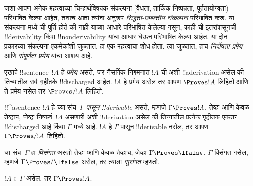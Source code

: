 \documentclass[../../../include/open-logic-section]{subfiles}
\begin{document}
      {}
      {}







\begin{explain}
जशा आपण अनेक महत्त्वाच्या चिन्हार्थविषयक संकल्पना (वैधता, तार्किक निष्पन्नता,
पूर्ततायोग्यता) परिभाषित केल्या आहेत, तशाच आता त्यांना अनुरूप
\emph{सिद्धता-उपपत्तीय संकल्पना} परिभाषित करू. या संकल्पना मध्ये
ची पूर्ति होते की नाही याच्या आधारे परिभाषित केलेल्या नसून,
काही ची इतरांपासूनची !!{derivability} किंवा
!!{nonderivability} यांचा आधार घेऊन परिभाषित केल्या आहेत. या दोन प्रकारच्या
संकल्पना एकमेकांशी जुळतात, हा एक महत्त्वाचा शोध होता. त्या जुळतात, हाच
\emph{निर्दोषता प्रमेय} आणि \emph{संपूर्णता प्रमेय} यांचा आशय आहे.
\end{explain}


\begin{defn}[प्रमेये]
एखादे !!{sentence}~$!A$ हे \emph{प्रमेय} असते, जर नैसर्गिक निगमनात $!A$ ची
अशी !!a{derivation} असेल की तिच्यातील सर्व गृहीतके !!{discharged} आहेत.
$!A$ हे प्रमेय असेल तर आपण $\Proves !A$ लिहितो आणि ते प्रमेय नसेल तर
$\Proves/ !A$ लिहितो.
\end{defn}

\begin{defn}[!!^{derivability}]
!!^a{sentence} $!A$ हे च्या संच~$\Gamma$ \emph{पासून
!!{derivable}} असते, म्हणजे $\Gamma \Proves !A$, तेव्हा आणि केवळ तेव्हाच,
जेव्हा निष्कर्ष~$!A$ असणारी अशी !!{derivation} असेल की तिच्यातील प्रत्येक
गृहीतक एकतर !!{discharged} आहे किंवा $\Gamma$ मध्ये आहे. $!A$ हे $\Gamma$
पासून !!{derivable} नसेल, तर आपण $\Gamma \Proves/ !A$ लिहितो.
\end{defn}

\begin{defn}[सुसंगतता]
चा संच~$\Gamma$ हा \emph{विसंगत} असतो तेव्हा आणि केवळ तेव्हाच,
जेव्हा $\Gamma \Proves \lfalse$. $\Gamma$ विसंगत नसेल, म्हणजे
$\Gamma \Proves/ \lfalse$ असेल, तर त्याला \emph{सुसंगत} म्हणतो.
\end{defn}

\begin{prop}[परावर्तिता]
$!A \in \Gamma$ असेल, तर $\Gamma \Proves !A$.
\end{prop}
\end{document}
